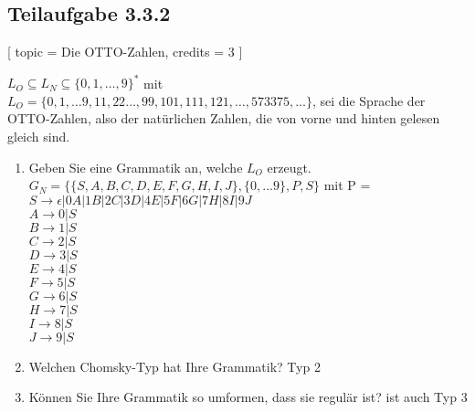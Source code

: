\documentclass[12pt]{article}
\begin{document}
  
  
  
 \subsection*{Teilaufgabe 3.3.2} [ 
 topic = Die OTTO-Zahlen, 
 credits = 3 
 ] 
  
 $L_O \subseteq L_N \subseteq \{0,1,\ldots,9\}^*$ mit $L_O = \{0, 1, \ldots 9, 11, 22 \ldots , 99, 101, 111, 121, \ldots , 573375, \ldots \}$, sei die Sprache der OTTO-Zahlen, also der natürlichen Zahlen, die von vorne und hinten gelesen gleich sind. 
 \begin{enumerate} 
 \item Geben Sie eine Grammatik an, welche $L_O$ erzeugt. 
 $G_N = \{\{S,A,B,C,D,E,F,G,H,I,J\},\{0,...9\},P,S\}$ mit P =
 $S \rightarrow \epsilon|0A|1B|2C|3D|4E|5F|6G|7H|8I|9J$\\
 $A \rightarrow 0 | S$\\
 $B \rightarrow 1 | S$\\
 $C \rightarrow 2 | S$\\
 $D \rightarrow 3 | S$\\
 $E \rightarrow 4 | S$\\
 $F \rightarrow 5 | S$\\
 $G \rightarrow 6 | S$\\
 $H \rightarrow 7 | S$\\
 $I \rightarrow 8 | S$\\
 $J \rightarrow 9 | S$ 
 \item Welchen Chomsky-Typ hat Ihre Grammatik? 
 Typ 2
 \item Können Sie Ihre Grammatik so umformen, dass sie regulär ist? 
 ist auch Typ 3
 \end{enumerate}  
  
  
 
\end{document}
